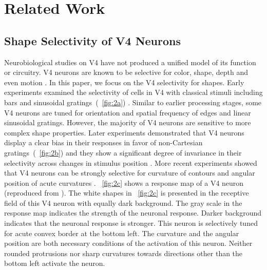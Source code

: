 \documentclass[conference]{IEEEtran}
\begin{document}
\section{Related Work}
\label{sec:2}

\subsection{Shape Selectivity of V4 Neurons}

Neurobiological studies on V4 have not produced a unified model of its function or circuitry.
V4 neurons are known to be selective for color, shape, depth and even motion \cite{roe2012}.
In this paper, we focus on the V4 selectivity for shapes. 
Early experiments examined the selectivity of cells in V4 
with classical stimuli including bars and sinusoidal gratings~(\figurename~\ref{fig:2a}) \cite{desimone1987}.
Similar to earlier processing stages, some V4 neurons are tuned for orientation 
and spatial frequency of edges and linear sinusoidal gratings.
However, the majority of V4 neurons are sensitive to more complex shape properties. 
Later experiments demonstrated that V4 neurons display a clear bias in their responses 
in favor of non-Cartesian gratings~(\figurename~\ref{fig:2b}) and they show a significant degree of invariance 
in their selectivity across changes in stimulus position \cite{gallant1996}.
More recent experiments showed that V4 neurons can be strongly selective for curvature
of contours and angular position of acute curvatures \cite{pasupathy1999,pasupathy2001}. 
\figurename~\ref{fig:2c} shows a response map of a V4 neuron
(reproduced from \cite{pasupathy2001}).
The white shapes in \figurename~\ref{fig:2c} is presented in the receptive field of this V4 neuron
with equally dark background. 
The gray scale in the response map indicates the strength of the neuronal response.
Darker background indicates that the neuronal response is stronger.
This neuron is selectively tuned for acute convex border at the bottom left.
The curvature and the angular position are both necessary conditions of the activation of this neuron.
Neither rounded protrusions nor sharp curvatures towards directions other than the bottom left
activate the neuron.
\end{document}
